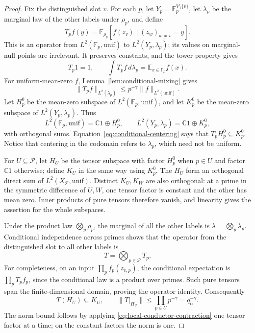 \begin{proof}
Fix the distinguished slot \(v\).  For each \(p\), let
\(Y_p=\mathbb F_p^{V\setminus\{v\}}\), let \(\lambda_p\) be
the marginal law of the other labels under \(\rho_p\), and define
\[
 T_pf(y)=\mathbb E_{\rho_p}[f(z_v)\mid (z_w)_{w\ne v}=y].
\]
This is an operator from \(L^2(\mathbb F_p,\mathrm{unif})\) to
\(L^2(Y_p,\lambda_p)\); its values on marginal-null points are
irrelevant.  It preserves constants, and the tower property gives
\begin{equation}
 T_p1=1,
 \qquad
 \int T_pf\,d\lambda_p=\mathbb E_{x\in\mathbb F_p}f(x).
 \label{eq:conditional-centering}
\end{equation}
For uniform-mean-zero \(f\), Lemma~\ref{lem:conditional-mixing}
gives
\begin{equation}
 \|T_pf\|_{L^2(\lambda_p)}
   \le p^{-\gamma}\|f\|_{L^2(\mathrm{unif})}.
 \label{eq:local-conductor-contraction}
\end{equation}
Let \(H_p^0\) be the mean-zero subspace of
\(L^2(\mathbb F_p,\mathrm{unif})\), and let \(K_p^0\) be the
mean-zero subspace of \(L^2(Y_p,\lambda_p)\).  Thus
\[
 L^2(\mathbb F_p,\mathrm{unif})=\mathbb C1\mathbin{\oplus}H_p^0,
 \qquad
 L^2(Y_p,\lambda_p)=\mathbb C1\mathbin{\oplus}K_p^0,
\]
with orthogonal sums.  Equation~\eqref{eq:conditional-centering}
says that \(T_pH_p^0\subseteq K_p^0\).  Notice that centering in
the codomain refers to \(\lambda_p\), which need not be uniform.

For \(U\subseteq\mathcal P\), let \(H_U\) be the tensor subspace
with factor \(H_p^0\) when \(p\in U\) and factor \(\mathbb C1\)
otherwise; define \(K_U\) in the same way using \(K_p^0\).
The \(H_U\) form an orthogonal direct sum of
\(L^2(X_{\mathcal P},\mathrm{unif})\).  Distinct \(K_U,K_W\)
are also orthogonal: at a prime in the symmetric difference of \(U,W\),
one tensor factor is constant and the other has mean zero.  Inner products
of pure tensors therefore vanish, and linearity gives the assertion for
the whole subspaces.

Under the product law \(\bigotimes_p\rho_p\), the marginal of all
the other labels is \(\lambda=\bigotimes_p\lambda_p\).  Conditional
independence across primes shows that the operator from the distinguished
slot to all other labels is
\[
 T=\bigotimes_{p\in\mathcal P}T_p.
\]
For completeness, on an input \(\prod_pf_p(z_{v,p})\), the conditional
expectation is \(\prod_pT_pf_p\), since the conditional law is a
product over primes.  Such pure tensors span the finite-dimensional
domain, proving the operator identity.  Consequently
\begin{equation}
 T(H_U)\subseteq K_U,
 \qquad
 \|T|_{H_U}\|\le\prod_{p\in U}p^{-\gamma}=q_U^{-\gamma}.
 \label{eq:exact-support-contraction}
\end{equation}
The norm bound follows by applying
\eqref{eq:local-conductor-contraction} one tensor factor at a time;
on the constant factors the norm is one.


\end{proof}
